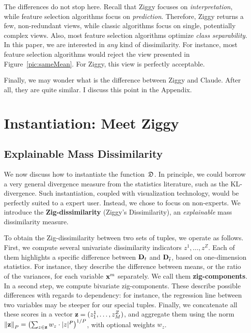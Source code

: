 The differences do not stop here. Recall that Ziggy focuses on
\emph{interpretation}, while feature selection algorithms focus on
\emph{prediction}. Therefore, Ziggy returns a few, non-redundant views, while
classic algorithms focus on single, potentially complex views. Also, most
feature selection algorithms optimize \emph{class separability}. In this paper,
we are interested in \emph{any} kind of dissimilarity. For instance, most
feature selection algorithms would reject the view presented
in Figure~\ref{pic:sameMean}. For Ziggy, this view is perfectly acceptable. 

Finally, we may wonder what is the difference between Ziggy and Claude. After
all, they are quite similar. I discuss this point in the Appendix.


\section{Instantiation: Meet Ziggy}
\label{sec:instantiation}

\subsection{Explainable Mass Dissimilarity}
\label{sec:explain}

We now discuss how to instantiate the function~$\mathfrak{D}$. In principle, we could
borrow a very general divergence measure from the statistics literature, such
as the KL-divergence.  Such instantiation, coupled with visualization
technology, would be perfectly suited to a expert user. Instead, we chose to
focus on non-experts. We introduce the \textbf{Zig-dissimilarity} (Ziggy's
Dissimilarity), an \emph{explainable} mass dissimilarity
measure.

To obtain the Zig-dissimilarity between two sets of tuples, we operate as
follows. First, we compute several univariate dissimilarity indicators $z^1,
\ldots, z^Z$.  Each of them highlights a specific difference between $\mathbf{D}_t$
and $\mathbf{D}_{\overline{t}}$, based on one-dimension statistics. For instance,
they describe the difference between means, or the ratio of the variances, for
each variable $\mathbf{x}^m$ separately.  We call them \textbf{zig-components}.  In
a second step, we compute bivariate zig-components. These describe possible
differences with regards to dependency: for instance, the regression line
between two variables may be steeper for our special tuples. Finally, we
concatenate all these scores in a vector $\mathbf{z}=(z^1_1, \ldots, z^Z_M)$, and
aggregate them using the norm $\left\lVert \mathbf{z} \right\rVert_P=\left(\sum_{z \in \mathbf{z}} w_z
\cdot |z|^P \right)^{1/P}$, with optional weights $w_z$.

